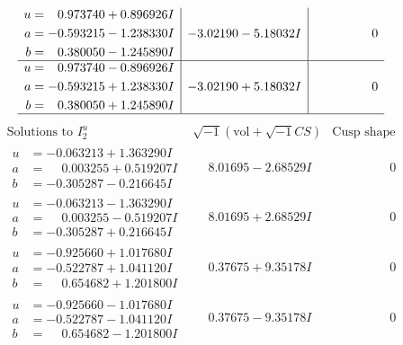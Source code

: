 \documentclass[1p]{elsarticle_modified}
\theoremstyle{definition}
\newcommand{\I}{\sqrt{-1}}
\begin{document}
$$\begin{array}{c|c|c}
\begin{aligned}
u &= \phantom{-}0.973740 + 0.896926 I \\
a &= -0.593215 - 1.238330 I \\
b &= \phantom{-}0.380050 - 1.245890 I\end{aligned}
 & -3.02190 - 5.18032 I & \phantom{-0.000000 } 0 \\ \hline\begin{aligned}
u &= \phantom{-}0.973740 - 0.896926 I \\
a &= -0.593215 + 1.238330 I \\
b &= \phantom{-}0.380050 + 1.245890 I\end{aligned}
 & -3.02190 + 5.18032 I & \phantom{-0.000000 } 0\\
 \hline 
 \end{array}$$\newpage$$\begin{array}{c|c|c}  
\text{Solutions to }I^u_{2}& \I (\text{vol} + \sqrt{-1}CS) & \text{Cusp shape}\\
 \hline 
\begin{aligned}
u &= -0.063213 + 1.363290 I \\
a &= \phantom{-}0.003255 + 0.519207 I \\
b &= -0.305287 - 0.216645 I\end{aligned}
 & \phantom{-}8.01695 - 2.68529 I & \phantom{-0.000000 } 0 \\ \hline\begin{aligned}
u &= -0.063213 - 1.363290 I \\
a &= \phantom{-}0.003255 - 0.519207 I \\
b &= -0.305287 + 0.216645 I\end{aligned}
 & \phantom{-}8.01695 + 2.68529 I & \phantom{-0.000000 } 0 \\ \hline\begin{aligned}
u &= -0.925660 + 1.017680 I \\
a &= -0.522787 + 1.041120 I \\
b &= \phantom{-}0.654682 + 1.201800 I\end{aligned}
 & \phantom{-}0.37675 + 9.35178 I & \phantom{-0.000000 } 0 \\ \hline\begin{aligned}
u &= -0.925660 - 1.017680 I \\
a &= -0.522787 - 1.041120 I \\
b &= \phantom{-}0.654682 - 1.201800 I\end{aligned}
 & \phantom{-}0.37675 - 9.35178 I & \phantom{-0.000000 } 0 \\ \hline\begin{aligned}

\end{aligned}
\end{array}$$
\end{document}
